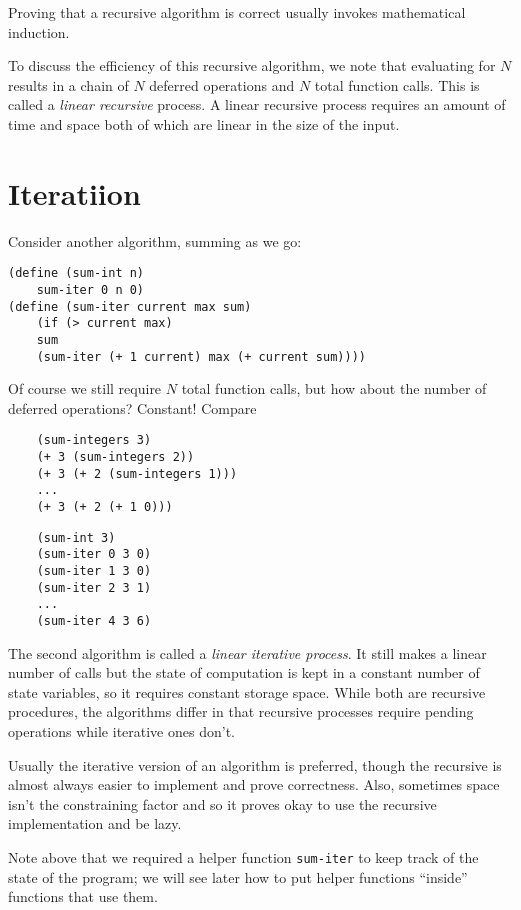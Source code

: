 \documentclass[10pt]{report}
\begin{document}
Proving that a recursive algorithm is correct usually invokes mathematical induction.

To discuss the efficiency of this recursive algorithm, we note that evaluating for $N$ results in a chain of $N$ deferred operations and $N$ total function calls. This is called a \emph{linear recursive} process. A linear recursive process requires an amount of time and space both of which are linear in the size of the input. 

\section{Iteratiion}

Consider another algorithm, summing as we go:
\begin{verbatim}
(define (sum-int n)
    sum-iter 0 n 0)
(define (sum-iter current max sum)
    (if (> current max)
    sum
    (sum-iter (+ 1 current) max (+ current sum))))
\end{verbatim}

Of course we still require $N$ total function calls, but how about the number of deferred operations? Constant! Compare
\begin{paracol}{2}
    \begin{verbatim}
    (sum-integers 3)
    (+ 3 (sum-integers 2))
    (+ 3 (+ 2 (sum-integers 1)))
    ...
    (+ 3 (+ 2 (+ 1 0)))
    \end{verbatim}
    \switchcolumn
    \begin{verbatim}
    (sum-int 3)
    (sum-iter 0 3 0)
    (sum-iter 1 3 0)
    (sum-iter 2 3 1)
    ...
    (sum-iter 4 3 6)
    \end{verbatim}
\end{paracol}

The second algorithm is called a \emph{linear iterative process}. It still makes a linear number of calls but the state of computation is kept in a constant number of state variables, so it requires constant storage space. While both are recursive procedures, the algorithms differ in that recursive processes require pending operations while iterative ones don't. 

Usually the iterative version of an algorithm is preferred, though the recursive is almost always easier to implement and prove correctness. Also, sometimes space isn't the constraining factor and so it proves okay to use the recursive implementation and be lazy. 

Note above that we required a helper function \texttt{sum-iter} to keep track of the state of the program; we will see later how to put helper functions ``inside'' functions that use them.
\end{document}
